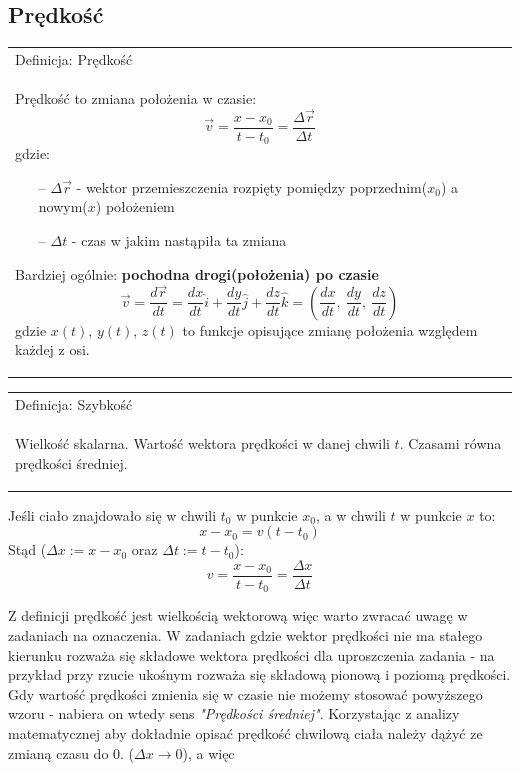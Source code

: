 \documentclass[a4paper]{article}
\newenvironment{definition}[2][Definicja]
    {
        \begin{center}
        \begin{tabular}{|p{1\textwidth}|}
        \hline
            #1: #2\\[2ex]
        \begin{em}
        \Large
    }
    { 
        \end{em}
        \\\hline
        \end{tabular} 
        \end{center}
    }
\begin{document}
    \subsection{\LARGE Prędkość}
        \Large
        \begin{definition}{Prędkość}
            Prędkość to zmiana położenia w czasie:
            \[\vec{v} = \frac{x - x_0}{t - t_0} = \frac{\Delta\vec{r}}{\Delta t}\]
            gdzie:
            \begin{itemize}
                \item[--] $\Delta\vec{r}$ - wektor przemieszczenia rozpięty pomiędzy poprzednim($x_0$) a nowym($x$) położeniem
                \item[--] $\Delta t$ - czas w jakim nastąpiła ta zmiana 
            \end{itemize}
            Bardziej ogólnie: \textbf{pochodna drogi(położenia) po czasie} 
            \[\vec{v} = \frac{d\vec{r}}{dt} = \frac{dx}{dt}\hat{i} + \frac{dy}{dt}\hat{j} + \frac{dz}{dt}\hat{k} 
            = \left (\frac{dx}{dt},\ \frac{dy}{dt},\ \frac{dz}{dt} \right )\]
            gdzie $x(t)$, $y(t)$, $z(t)$ to funkcje opisujące zmianę położenia względem każdej z osi.
        \end{definition}
        \begin{definition}{Szybkość}
            Wielkość skalarna. Wartość wektora prędkości w danej chwili $t$. Czasami równa prędkości średniej.
        \end{definition}
        Jeśli ciało znajdowało się w chwili $t_0$ w punkcie $x_0$, a w chwili $t$ w punkcie $x$ to:
        \[x - x_0 = v(t - t_0) \]
        Stąd ($\Delta x := x - x_0$ oraz $\Delta t := t - t_0$):
        \[v = \frac{x - x_0}{t - t_0} = \frac{\Delta x}{\Delta t}\]
        
        Z definicji prędkość jest wielkością wektorową więc warto zwracać uwagę w zadaniach na oznaczenia. W zadaniach gdzie wektor prędkości nie ma stałego kierunku rozważa się składowe wektora prędkości dla uproszczenia zadania - na przykład przy rzucie ukośnym rozważa się składową pionową i poziomą prędkości.\\

        Gdy wartość prędkości zmienia się w czasie nie możemy stosować powyższego wzoru - nabiera on wtedy sens \textit{"Prędkości średniej"}. 
        Korzystając z analizy matematycznej aby dokładnie opisać prędkość chwilową ciała należy dążyć ze zmianą czasu do 0. ($\Delta x\rightarrow 0$), a więc
\end{document}
